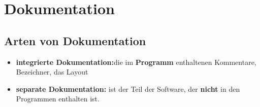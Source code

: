 \documentclass{book}
\begin{document}
    \section{Dokumentation}
    \subsection{Arten von Dokumentation}
    \begin{itemize}
        \item \textbf{integrierte Dokumentation:}die im\textbf{ Programm }
        enthaltenen Kommentare, Bezeichner, das Layout
        \item \textbf{separate Dokumentation: } ist der Teil der Software, der
        \textbf{nicht }in den Programmen enthalten ist.

    \end{itemize}
\end{document}
